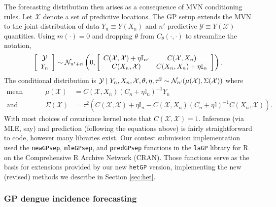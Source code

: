 \documentclass[12pt]{article}
\begin{document}
The forecasting distribution then arises as a consequence of MVN conditioning
rules.  Let $\mathcal{X}$ denote a set of predictive locations.  The GP setup
extends the MVN to the joint distribution of data $Y_n \equiv Y(X_n)$ and $n'$
predictive $\mathcal{Y}
\equiv Y(\mathcal{X})$ quantities.  Using $m(\cdot) = 0$ and dropping $\theta$
from $C_\theta(\cdot, \cdot)$ to streamline the notation,
\[
\left[ 
\begin{array}{c}
\mathcal{Y} \\ Y_n
\end{array} 
\right]
\sim \mathcal{N}_{n'+n}\left(0, 
\left[
\begin{array}{cc}
C(\mathcal{X}, \mathcal{X}) + \eta \mathbb{I}_{n'} & C(\mathcal{X}, X_n) \\
C(X_n, \mathcal{X}) & C(X_n, X_n) + \eta\mathbb{I}_n
\end{array}
\right]
\right).
\]
The conditional distribution is $\mathcal{Y} \mid Y_n, X_n, \mathcal{X}, 
\theta, \eta, \tau^2 \sim \mathcal{N}_{n'}(\mu(\mathcal{X}), \Sigma(\mathcal{X}))$ where
\begin{align}
\mbox{mean } && \mu(\mathcal{X}) &= C(\mathcal{X}, X_n) 
(C_n + \eta \mathbb{I}_n)^{-1} Y_n  \label{eq:gppred} \\
\mbox{and variance } && \Sigma(\mathcal{X}) &= \tau^2(C(\mathcal{X}, \mathcal{X}) + 
\eta\mathbb{I}_n - C(\mathcal{X}, X_n) (C_n + \eta\mathbb{I})^{-1} C(X_n, \mathcal{X})). \nonumber
\end{align}
With most choices of covariance kernel note that $C(\mathcal{X}, \mathcal{X})
= 1$. Inference (via MLE, say) and prediction (following the equations above)
is fairly straightforward to code, however many libraries exist.  Our
contest submission implementation used the {\tt newGPsep}, {\tt mleGPsep},
and {\tt predGPsep} functions in the {\tt laGP} library
\citep{laGP,gramacy:lagp:2016} for {\sf R} \citep{cranR} on the Comprehensive
{\sf R} Archive Network (CRAN). Those functions serve as the basis for
extensions provided by our new {\tt hetGP} version, implementing the new
(revised) methods we describe in Section
\ref{sec:het}.

\subsubsection{GP dengue incidence forecasting}
\label{sec:preds}
\end{document}
